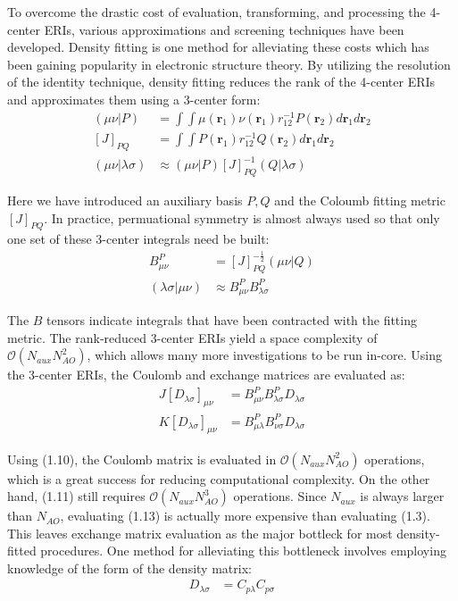 To overcome the drastic cost of evaluation, transforming, and processing the 4-center ERIs, various approximations 
and screening techniques have been developed.  
Density fitting is one method for alleviating these costs which has been gaining popularity in electronic structure theory.
By utilizing the resolution of the identity technique, 
density fitting reduces the rank of the 4-center ERIs and approximates them using a 3-center form: 
\begin{align} 
(\mu \nu|P) &= \int \int \mu(\textbf{r}_{1}) 
\nu(\textbf{r}_{1}) r^{-1}_{12} P(\textbf{r}_{2}) d\textbf{r}_{1} d\textbf{r}_{2} \\
[J]_{PQ} &= \int \int P(\textbf{r}_1)r_{12}^{-1}Q(\textbf{r}_2) d{\textbf{r}_{1}}d{\textbf{r}_{2}} \\
(\mu \nu|\lambda \sigma) &\approx (\mu \nu| P)[J]_{PQ}^{-1}(Q|\lambda \sigma)  
\end{align} 

\noindent Here we have introduced an auxiliary basis $P, Q$ and the Coloumb fitting metric $[J]_{PQ}$. 
In practice, permuational symmetry is almost always used so that only one set of these 3-center integrals need be built:
\begin{align} 
B_{\mu \nu}^P &= [J]_{PQ}^{-\frac{1}{2}}(\mu \nu | Q)  \\ 
(\lambda \sigma | \mu \nu) &\approx  B_{\mu \nu}^P B_{\lambda \sigma}^P  \end{align} 

\noindent The $B$ tensors indicate integrals that have been contracted with the fitting metric.
The rank-reduced 3-center ERIs yield a space complexity of $\mathcal{O}(N_{aux}N_{AO}^2)$, 
which allows many more investigations to be run in-core.  
Using the 3-center ERIs, the Coulomb and exchange matrices are evaluated as: 
\begin{align}
J[D_{\lambda \sigma}]_{\mu \nu} &= B_{\mu \nu}^P B_{\lambda \sigma}^PD_{\lambda \sigma} \\
K[D_{\lambda \sigma}]_{\mu \nu} &= B_{\mu \lambda}^P B_{\nu \sigma}^PD_{\lambda \sigma}
\end{align}

\noindent Using (1.10), the Coulomb matrix is evaluated in $\mathcal{O}(N_{aux}N_{AO}^2)$ operations, which is a great success
for reducing computational complexity. On the other hand, (1.11) still requires $\mathcal{O}(N_{aux}N_{AO}^3)$ operations. 
Since $N_{aux}$ is always larger than $N_{AO}$, evaluating (1.13) is actually more expensive than evaluating (1.3).
This leaves exchange matrix evaluation as the major bottleck for most density-fitted procedures.
One method for alleviating this bottleneck involves employing knowledge 
of the form of the density matrix:
\begin{align}
D_{\lambda \sigma} &= C_{p\lambda}C_{p\sigma} 
\end{align}

